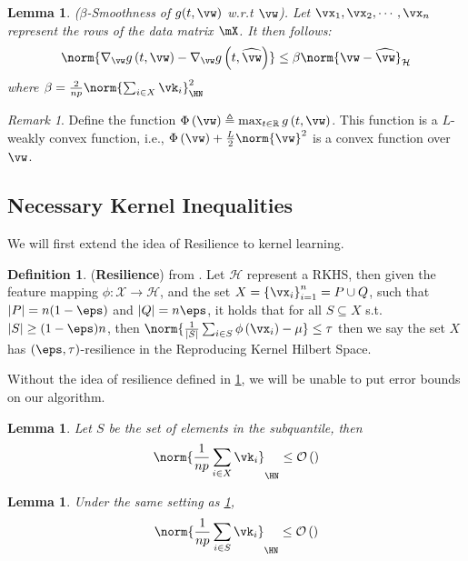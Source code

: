 \documentclass{article} %
\theoremstyle{plain}
\newtheorem{lemma}[thm]{Lemma}
\theoremstyle{definition}
\newtheorem{definition}[thm]{Definition}
\theoremstyle{remark}
\newtheorem{remark}[thm]{Remark}
\newcommand{\ccref}[1]{\textcolor{black}{\cref{#1}}}
\begin{document}
	
	\begin{lemma}\label{lem:kernel-classification-beta}
		($\beta$-Smoothness of $g(t,\vw)$ w.r.t $\vw$). Let $\vx_1,\vx_2,\cdots,\vx_n$ represent the rows of the data matrix $\mX$. It then follows:
		\begin{equation}
			\norm{\nabla_\vw g\left(t,\vw\right) - \nabla_\vw g\left(t,\widehat{\vw}\right)} \leq \beta \norm{\vw - \widehat{\vw}}_{\mathcal{H}}
		\end{equation}
		where $ \beta = \frac{2}{np}\norm{\sum_{i \in X}\vk_i}_{\HN}^2$
	\end{lemma}
	
	\begin{remark}
		\label{rmk:phi}
		Define the function $ \Phi\left(\vw\right) \triangleq \max_{t \in \mathbb{R}} g\left(t,\vw\right)$. This function is a $L$-weakly convex function, i.e., $ \Phi\left(\vw\right) + \frac{L}{2}\norm{\vw}^2$ is a convex function over $\vw$.
	\end{remark}
	\subsection{Necessary Kernel Inequalities}
	We will first extend the idea of Resilience \cite{steinhardt:2018} to kernel learning. 
	\begin{definition}
		\label{def:resilience}
		(\textbf{Resilience}) from \citep{steinhardt:2018}. Let $\mathcal{H}$ represent a RKHS, then given the feature mapping $\phi:\mathcal{X} \to \mathcal{H}$, and the set $X = \left\{\vx_i\right\}_{i=1}^n = P \cup Q$, such that $|P| = n(1-\eps)$ and $|Q| = n\eps$, it holds that for all $S \subseteq X$ s.t. $|S| \geq (1-\eps)n$, then $ \norm{\frac{1}{|S|}\sum_{i\in S}\phi\left(\vx_i\right) - \mu} \leq \tau$ then we say the set $X$ has $(\eps,\tau)$-resilience in the Reproducing Kernel Hilbert Space.
	\end{definition}
	Without the idea of resilience defined in \ccref{def:resilience}, we will be unable to put error bounds on our algorithm. 
	\begin{lemma} \label{lem:norm-sum-kernel-all}
		Let $S$ be the set of elements in the subquantile, then 
		\begin{equation}
			\norm{\frac{1}{np}\sum_{i \in X} \vk_{i}}_{\HN} \leq \mathcal{O}\left(\right)
		\end{equation}
	\end{lemma}
	\begin{lemma} \label{lem:norm-sum-kernel-subquantile}
		Under the same setting as \ccref{lem:norm-sum-kernel-all},
		\begin{equation}
			\norm{\frac{1}{np}\sum_{i \in S} \vk_{i}}_{\HN} \leq \mathcal{O}\left(\right) 
		\end{equation}
	\end{lemma}
	
\end{document}
